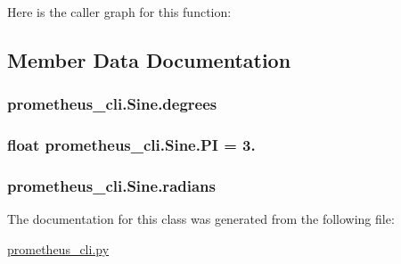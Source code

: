 Here is the caller graph for this function\+:




\subsection{Member Data Documentation}
\hypertarget{classprometheus__cli_1_1_sine_a23158d1b1970c7977417866d3908fb23}{}
\subsubsection[{degrees}]{\setlength{\rightskip}{0pt plus 5cm}prometheus\+\_\+cli.\+Sine.\+degrees}\label{classprometheus__cli_1_1_sine_a23158d1b1970c7977417866d3908fb23}
\hypertarget{classprometheus__cli_1_1_sine_abc4697ef15f4b8e0f99a26370c9f3d1c}{}
\subsubsection[{P\+I}]{\setlength{\rightskip}{0pt plus 5cm}float prometheus\+\_\+cli.\+Sine.\+P\+I = 3.\hspace{0.3cm}{\ttfamily [static]}}\label{classprometheus__cli_1_1_sine_abc4697ef15f4b8e0f99a26370c9f3d1c}
\hypertarget{classprometheus__cli_1_1_sine_a6b7a6a9495a721129804a49262ff0fd8}{}
\subsubsection[{radians}]{\setlength{\rightskip}{0pt plus 5cm}prometheus\+\_\+cli.\+Sine.\+radians}\label{classprometheus__cli_1_1_sine_a6b7a6a9495a721129804a49262ff0fd8}


The documentation for this class was generated from the following file\+:\begin{DoxyCompactItemize}
\item 
\hyperlink{prometheus__cli_8py}{prometheus\+\_\+cli.\+py}\end{DoxyCompactItemize}

